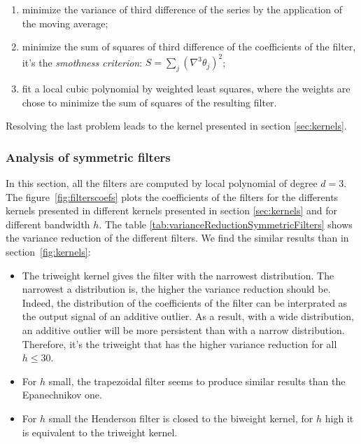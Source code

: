 \documentclass[
  12pt,
  ,
  a4paper]{article}
\providecommand{\tightlist}{%
  \setlength{\itemsep}{0pt}\setlength{\parskip}{0pt}}
\newcommand\1{\mathds{1}}
\begin{document}
\begin{enumerate}
\def\labelenumi{\arabic{enumi}.}
\tightlist
\item
  minimize the variance of third difference of the series by the application of the moving average;\\
\item
  minimize the sum of squares of third difference of the coefficients of the filter, it's the \emph{smothness criterion}: \(S=\sum_j(\nabla^{3}\theta_{j})^{2}\);\\
\item
  fit a local cubic polynomial by weighted least squares, where the weights are chose to minimize the sum of squares of the resulting filter.
\end{enumerate}

Resolving the last problem leads to the kernel presented in section \ref{sec:kernels}.

\hypertarget{analysis-of-symmetric-filters}{%
\subsubsection{Analysis of symmetric filters}\label{analysis-of-symmetric-filters}}

In this section, all the filters are computed by local polynomial of degree \(d=3\).
The figure~\ref{fig:filterscoefs} plots the coefficients of the filters for the differents kernels presented in different kernels presented in section \ref{sec:kernels} and for different bandwidth \(h\).
The table \ref{tab:varianceReductionSymmetricFilters} shows the variance reduction of the different filters.
We find the similar results than in section~\ref{fig:kernels}:

\begin{itemize}
\item
  The triweight kernel gives the filter with the narrowest distribution.
  The narrowest a distribution is, the higher the variance reduction should be.
  Indeed, the distribution of the coefficients of the filter can be interprated as the output signal of an additive outlier.
  As a result, with a wide distribution, an additive outlier will be more persistent than with a narrow distribution.
  Therefore, it's the triweight that has the higher variance reduction for all \(h\leq30\).
\item
  For \(h\) small, the trapezoidal filter seems to produce similar results than the Epanechnikov one.
\item
  For \(h\) small the Henderson filter is closed to the biweight kernel, for \(h\) high it is equivalent to the triweight kernel.
\end{itemize}
\end{document}

